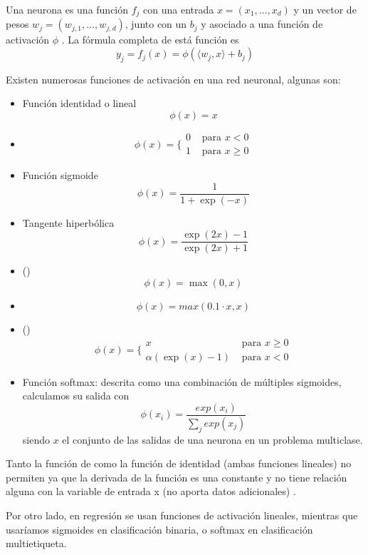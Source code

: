 \begin{enumerate}
        Una neurona es una función $f_j$ con una entrada $x = (x_1, \ldots , x_d)$ y un vector de pesos $w_j = (w_{j,1}, \ldots , w_{j,d})$, junto con un  $b_j$ y asociado a una función de activación $\phi$ . La fórmula completa de está función es \[y_j = f_j(x) = \phi (\langle w_j, x \rangle + b_j )\]

        Existen numerosas funciones de activación en una red neuronal, algunas son:
        \begin{itemize}
          \item Función identidad o lineal \[\phi(x) = x\]
          \item {} \[\phi(x) = \lbrace\begin{array}{ll}0 & \text{ para } x<0 \\ 1 & \text{ para } x \geq 0\end{array}\]
          \item Función sigmoide \[\phi(x) = \frac{1}{1 + \exp(-x)}\]
          \item Tangente hiperbólica \[\phi(x) = \frac{\exp(2x) -1 }{\exp(2x) + 1}\]
          \item {} () \[\phi(x) = \max(0, x)\]
          \item {}  \[\phi(x) = max(0.1 \cdot x,x)\]
          \item {} () \[\phi(x) = \lbrace\begin{array}{ll}x & \text{ para } x \geq 0 \\ \alpha(\exp(x) - 1) & \text{ para } x < 0\end{array}\]
          \item Función softmax: descrita como una combinación de múltiples sigmoides, calculamos su salida con \[\phi(x_i) = \frac{exp(x_i)}{\sum_j exp(x_j)}\] siendo $x$ el conjunto de las salidas de una neurona en un problema multiclase.
        \end{itemize}

        Tanto la función de  como la función de identidad (ambas funciones lineales) no permiten  ya que la derivada de la función es una constante y no tiene relación alguna con la variable de entrada x (no aporta datos adicionales) .

        Por otro lado, en regresión se usan funciones de activación lineales, mientras que usaríamos sigmoides en clasificación binaria, o softmax en clasificación multietiqueta.


\end{enumerate}
